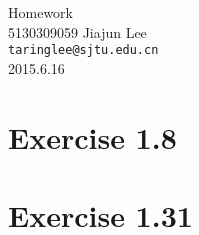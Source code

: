 \documentclass[11pt, fleqn, a4paper]{report}
\begin{document}
\hypersetup{CJKbookmarks=true}

\begin{titlepage}
\vspace*{40mm}
\begin{center}
{\heiti \Huge Homework }\\[30mm]

{\Large 5130309059 \quad \quad Jiajun Lee}\\[3mm]
\texttt{taringlee@sjtu.edu.cn}\\[10mm]

2015.6.16

\end{center}
\end{titlepage}

\section*{Exercise 1.8}


\section*{Exercise 1.31}
\end{document}
